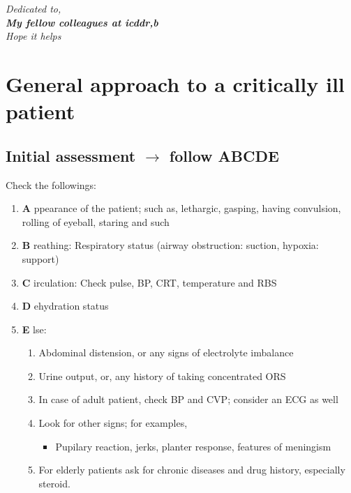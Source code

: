 \documentclass[11pt,a4paper]{report}
\begin{document}
\tableofcontents
\listoffigures
\listoftables


\newpage
\clearpage
\begin{flushright}
	\thispagestyle{empty}
	\vspace*{\fill}
	\textit{Dedicated to, }\\ 
	\vspace{7.0mm}
	\textbf{\textit{ \fontsize{15}{1}\selectfont My fellow colleagues at icddr,b}}\\ 
	\vspace{5.00mm}
	\textit{Hope it helps}
	\vspace*{\fill}
\end{flushright}
\clearpage

\chapter[General approach]{General approach to a critically ill patient}


\section[Initial assessment]{Initial assessment $\rightarrow$ follow ABCDE}
Check the followings:

\begin{enumerate}[noitemsep]
	\item \textbf{A} ppearance of the patient; such as, lethargic, gasping, having convulsion, rolling of eyeball, staring and such
	\item \textbf{B} reathing: Respiratory status (airway obstruction: suction, hypoxia:  support)
	\item \textbf{C} irculation: Check pulse, BP, CRT, temperature and RBS
	\item \textbf{D} ehydration status 
	\item \textbf{E} lse: 
	\begin{enumerate}
		\item Abdominal distension, or any signs of electrolyte imbalance 
		\item Urine output, or, any history of taking concentrated ORS
		\item In case of adult patient, check BP and CVP; consider an ECG as well
		\item Look for other signs; for examples, 
		\begin{itemize}[noitemsep]
			\item Pupilary reaction, jerks, planter response, features of meningism
		\end{itemize}
		\item For elderly patients ask for chronic diseases and drug history, especially steroid. 
	\end{enumerate}
\end{enumerate}
\end{document}
